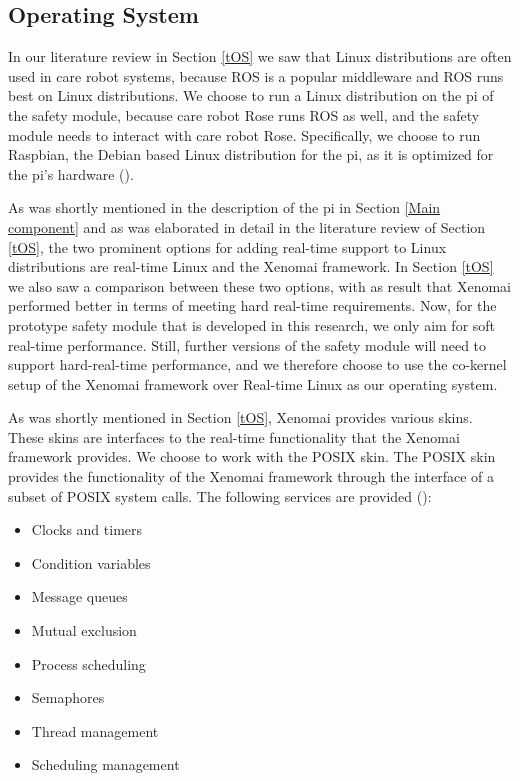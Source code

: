 \documentclass[12pt]{scrreprt}
\begin{document}
\subsection{Operating System}
\label{Operating System}
In our literature review in Section \ref{tOS} we saw that Linux distributions are often used in care robot systems, because ROS is a popular middleware and ROS runs best on Linux distributions. We choose to run a Linux distribution on the \gls{pi} of the safety module, because care robot Rose runs ROS as well, and the safety module needs to interact with care robot Rose. Specifically, we choose to run Raspbian, the Debian based Linux distribution for the \gls{pi}, as it is optimized for the \gls{pi}'s hardware (\cite{raspbian}).
\par
As was shortly mentioned in the description of the \gls{pi} in Section \ref{Main component} and as was elaborated in detail in the literature review of Section \ref{tOS}, the two prominent options for adding real-time support to Linux distributions are real-time Linux and the Xenomai framework. In Section \ref{tOS} we also saw a comparison between these two options, with as result that Xenomai performed better in terms of meeting hard real-time requirements. Now, for the prototype safety module that is developed in this research, we only aim for soft real-time performance. Still, further versions of the safety module will need to support hard-real-time performance, and we therefore choose to use the co-kernel setup of the Xenomai framework over Real-time Linux as our operating system.
\par 
As was shortly mentioned in Section \ref{tOS}, Xenomai provides various skins. These skins are interfaces to the real-time functionality that the Xenomai framework provides. We choose to work with the POSIX skin. The POSIX skin provides the functionality of the Xenomai framework through the interface of a subset of POSIX system calls. The following services are provided (\cite{posix_xenomai}):

\begin{itemize}\label{posix_wrapped}
    \item Clocks and timers
    \item Condition variables
    \item Message queues
    \item Mutual exclusion 
    \item Process scheduling 
    \item Semaphores
    \item Thread management
    \item Scheduling management
\end{itemize}
\end{document}
